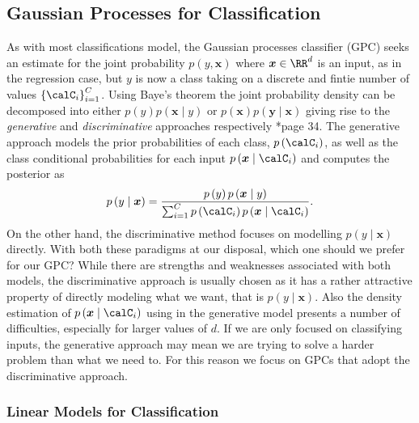 \subsection{Gaussian Processes for Classification}\label{Section1.6}

As with most classifications model, the Gaussian processes classifier (GPC) seeks an estimate for the joint probability $p \left( y , \bm{x} \right)$ where $\bm{x} \in \RR^d$ is an input, as in the regression case, but $y$ is now a class taking on a discrete and fintie number of values $\left\{ \calC_i \right\}_{i=1}^C$. Using Baye's theorem the joint probability density can be decomposed into either $p \left( y \right) p \left( \bm{x} \mid y \right)$ or $p \left( \bm{x} \right) p \left( \bm{y} \mid \bm{x} \right)$ giving rise to the {\it generative} and {\it discriminative} approaches respectively \cite{RasmussenCarlEdward2006Gpfm}*{page 34}. The generative approach models the prior probabilities of each class, $p \left( \calC_i \right)$, as well as the class conditional probabilities for each input $p \left( \bm{x} \mid \calC_i \right)$ and computes the posterior as
\[
    p \left( y \mid \bm{x} \right) = \frac{ p \left( y \right) p \left( \bm{x} \mid y \right) }{ \sum_{i=1}^{C} p \left( \calC_i \right) p \left( \bm{x} \mid \calC_i \right) }.
\]
On the other hand, the discriminative method focuses on modelling $p \left( y \mid \bm{x} \right)$ directly. With both these paradigms at our disposal, which one should we prefer for our GPC? While there are strengths and weaknesses associated with both models, the discriminative approach is usually chosen as it has a rather attractive property of directly modeling what we want, that is $p \left( y \mid \bm{x} \right)$. Also the density estimation of $p \left( \bm{x} \mid \calC_i \right)$ using in the generative model presents a number of difficulties, especially for larger values of $d$. If we are only focused on classifying inputs, the generative approach may mean we are trying to solve a harder problem than what we need to. For this reason we focus on GPCs that adopt the discriminative approach.

\subsubsection{Linear Models for Classification}\label{Section1.6.1}

